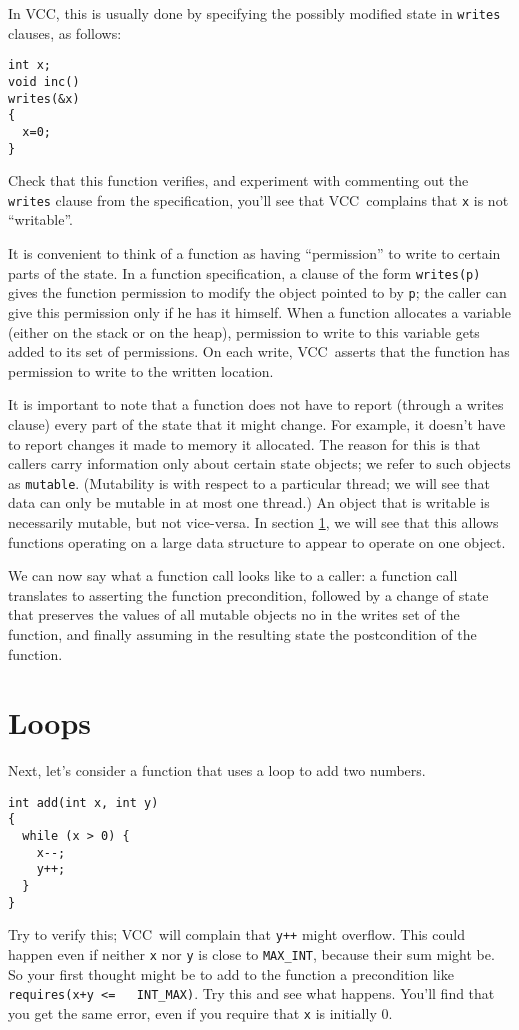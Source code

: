 \documentclass{report}
\newcommand{\Q}[1]{\lstinline~#1~}
\newcommand{\VCC}{VCC}
\newcommand{\Ref}[1]{section \ref{#1}}
\begin{document}
In \VCC, this is usually done by specifying the possibly modified
state in \Q{writes} clauses, as follows:
\begin{lstlisting}
int x;
void inc() 
writes(&x)
{
  x=0;
}
\end{lstlisting}
Check that this function verifies, and experiment with commenting out
the \Q{writes} clause from the specification, you'll see that
\VCC\ complains that \Q{x} is not ``writable''. 

It is convenient to think of a function as having ``permission'' to
write to certain parts of the state. In a function specification, a
clause of the form \Q{writes(p)} gives the function permission to
modify the object pointed to by \Q{p}; the caller can give this
permission only if he has it himself.  When a function allocates a
variable (either on the stack or on the heap), permission to write to
this variable gets added to its set of permissions. On each write,
\VCC\ asserts that the function has permission to write to the written
location.

It is important to note that a function does not have to report
(through a writes clause) every part of the state that it might
change. For example, it doesn't have to report changes it made to
memory it allocated. The reason for this is that callers carry
information only about certain state objects; we refer to such objects
as \Q{mutable}. (Mutability is with respect to a particular thread; we
will see that data can only be mutable in at most one thread.) An
object that is writable is necessarily mutable, but not vice-versa.
In \Ref{}, we will see that this allows functions operating
on a large data structure to appear to operate on one object.

We can now say what a function call looks like to a caller: a function
call translates to asserting the function precondition, followed by a
change of state that preserves the values of all mutable objects no in
the writes set of the function, and finally assuming in the resulting
state the postcondition of the function.

\section{Loops}
Next, let's consider a function that uses a loop to add two numbers.
\begin{lstlisting}
int add(int x, int y)
{
  while (x > 0) {
    x--;
    y++;
  }
}
\end{lstlisting}
Try to verify this; \VCC\ will complain that \Q{y++} might
overflow. This could happen even if neither \Q{x} nor \Q{y} is close
to \Q{MAX_INT}, because their sum might be. So your first thought
might be to add to the function a precondition like \Q{requires(x+y <=
  INT_MAX)}. Try this and see what happens. You'll find that you get
the same error, even if you require that \Q{x} is initially 0.
\end{document}
